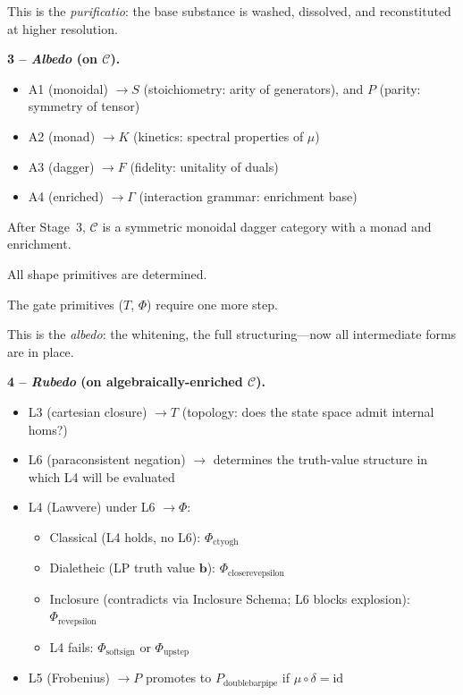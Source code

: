 \documentclass[twocolumn]{article}
\begin{document}
{\large This is the \emph{purificatio}: the base substance is washed, dissolved, and reconstituted at higher resolution.}

\bigskip
\noindent\textbf{\large 3 -- \emph{Albedo} (on $\mathcal{C}$).}
\begin{itemize}[nosep, leftmargin=1.5em]
  \item A1 (monoidal) $\to S$ (stoichiometry: arity of generators), and $P$ (parity: symmetry of tensor)
  \item A2 (monad) $\to K$ (kinetics: spectral properties of $\mu$)
  \item A3 (dagger) $\to F$ (fidelity: unitality of duals)
  \item A4 (enriched) $\to \Gamma$ (interaction grammar: enrichment base)
\end{itemize}

After Stage~3, $\mathcal{C}$ is a symmetric monoidal dagger category with a monad and enrichment.

All shape primitives are determined.

The gate primitives ($T$, $\Phi$) require one more step.

{\large This is the \emph{albedo}: the whitening, the full structuring—now all intermediate forms are in place.}

\bigskip
\noindent\textbf{\large 4 -- \emph{Rubedo} (on algebraically-enriched $\mathcal{C}$).}
\begin{itemize}[nosep, leftmargin=1.5em]
  \item L3 (cartesian closure) $\to T$ (topology: does the state space admit internal homs?)
  \item L6 (paraconsistent negation) $\to$ determines the truth-value structure in which L4 will be evaluated
  \item L4 (Lawvere) under L6 $\to \Phi$:
  \begin{itemize}[nosep, leftmargin=1em]
    \item[\small$\circ$] Classical (L4 holds, no L6): $\Phi_{\text{ctyogh}}$
    \item[\small$\circ$] Dialetheic (LP truth value $\mathbf{b}$): $\Phi_{\text{closerevepsilon}}$
    \item[\small$\circ$] Inclosure (contradicts via Inclosure Schema; L6 blocks explosion): $\Phi_{\text{revepsilon}}$
    \item[\small$\circ$] L4 fails: $\Phi_{\text{softsign}}$ or $\Phi_{\text{upstep}}$
  \end{itemize}
  \item L5 (Frobenius) $\to P$ promotes to $P_{\text{doublebarpipe}}$ if $\mu \circ \delta = \text{id}$
\end{itemize}
\end{document}
